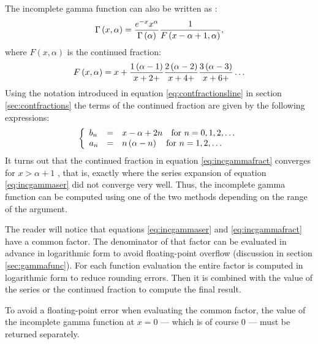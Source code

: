 The incomplete gamma function can also be written as
\cite{AbrSteg}:
\begin{equation}
\label{eq:incgammafract}
  \Gamma\left(x,\alpha\right)={e^{-x}x^\alpha\over\Gamma\left(\alpha\right)}
  {1 \over F\left(x-\alpha+1,\alpha\right)},
\end{equation}
where $F\left(x,\alpha\right)$ is the continued fraction:
\begin{equation}
  F\left(x,\alpha\right)=x+{1\left(\alpha -1\right)\over x+2+}
  {2\left(\alpha -2\right)\over x+4+}
  {3\left(\alpha -3\right)\over x+6+}\ldots
\end{equation}
Using the notation introduced in equation
\ref{eq:contfractionsline} in section \ref{sec:contfractions} the
terms of the continued fraction are given by the following
expressions:
\begin{equation}
\label{eq:incgammafractterm}
  \left\{{
  \begin{array}{lcl}
    b_n & = & x-\alpha+2n\mbox{\quad for $n=0,1,2,\ldots$}\\
    a_n & = &n\left(\alpha-n\right)\mbox{\quad for $n=1,2,\ldots$}
  \end{array}
  }\right.
\end{equation}
It turns out that the continued fraction in equation
\ref{eq:incgammafract} converges for $x>\alpha+1$ \cite{Press},
that is, exactly where the series expansion of equation
\ref{eq:incgammaser} did not converge very well. Thus, the
incomplete gamma function can be computed using one of the two
methods depending on the range of the argument.

The reader will notice that equations \ref{eq:incgammaser} and
\ref{eq:incgammafract} have a common factor. The denominator of
that factor can be evaluated in advance in logarithmic form to
avoid floating-point overflow (\cf discussion in section
\ref{sec:gammafunc}). For each function evaluation the entire
factor is computed in logarithmic form to reduce rounding errors.
Then it is combined with the value of the series or the continued
fraction to compute the final result.

To avoid a floating-point error when evaluating the common factor,
the value of the incomplete gamma function at $x=0$ --- which is
of course 0 --- must be returned separately.

